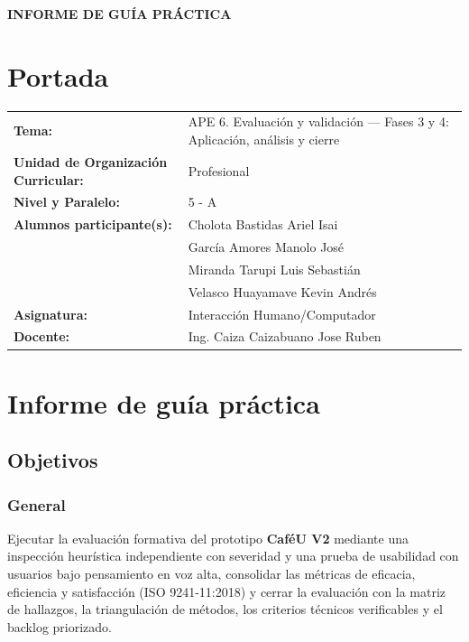 \documentclass{article}
\begin{document}
\begin{center}
    {\large \textbf{INFORME DE GUÍA PRÁCTICA}} \\
\end{center}

\section{Portada}
\begin{flushleft}
\begin{tabular}{ l p{9cm} }
    \textbf{Tema:} & APE 6. Evaluación y validación --- Fases 3 y 4: Aplicación, análisis y cierre \\
    \textbf{Unidad de Organización Curricular:} & Profesional \\
    \textbf{Nivel y Paralelo:} & 5 - A \\
    \textbf{Alumnos participante(s):} & Cholota Bastidas Ariel Isai \\
                                      & García Amores Manolo José \\
                                      & Miranda Tarupi Luis Sebastián \\
                                      & Velasco Huayamave Kevin Andrés \\
    \textbf{Asignatura:} & Interacción Humano/Computador \\
    \textbf{Docente:} & Ing. Caiza Caizabuano Jose Ruben \\
\end{tabular}
\end{flushleft}

\section{Informe de guía práctica}

\subsection{Objetivos}
\subsubsection{General}
Ejecutar la evaluación formativa del prototipo \textbf{CaféU V2} mediante una inspección heurística independiente con severidad y una prueba de usabilidad con usuarios bajo pensamiento en voz alta, consolidar las métricas de eficacia, eficiencia y satisfacción (ISO 9241-11:2018) y cerrar la evaluación con la matriz de hallazgos, la triangulación de métodos, los criterios técnicos verificables y el backlog priorizado.
\end{document}

